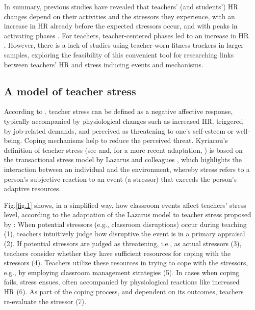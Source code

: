 \documentclass[preprint,
3p]{elsarticle} %
\begin{document}
In summary, previous studies have revealed that teachers' (and
students') HR changes depend on their activities and the stressors they
experience, with an increase in HR already before the expected stressors
occur, and with peaks in activating phases
\citep{Darnell2019, chalmers2021}. For teachers, teacher-centered phases
led to an increase in HR
\citep{sperka1995, scheuch1997psychophysische, donker2018, junker2021}.
However, there is a lack of studies using teacher-worn fitness trackers
in larger samples, exploring the feasibility of this convenient tool for
researching links between teachers' HR and stress inducing events and
mechanisms.

\subsection{A model of teacher stress}\label{a-model-of-teacher-stress}

According to \citet{kyriacou1978}, teacher stress can be defined as a
negative affective response, typically accompanied by physiological
changes such as increased HR, triggered by job-related demands, and
perceived as threatening to one's self-esteem or well-being. Coping
mechanisms help to reduce the perceived threat. Kyriacou's definition of
teacher stress (see \citet{kyriacou1978} and, for a more recent
adaptation, \citet{van2006stress}) is based on the transactional stress
model by Lazarus and colleagues
\citep{lazarus1966psychological, lazarus1990theory}, which highlights
the interaction between an individual and the environment, whereby
stress refers to a person's subjective reaction to an event (a stressor)
that exceeds the person's adaptive resources.

Fig.\ref{fig.1} shows, in a simplified way, how classroom events affect
teachers' stress level, according to the adaptation of the Lazarus model
to teacher stress proposed by \citet{van2006stress}: When potential
stressors (e.g., classroom disruptions) occur during teaching (1),
teachers intuitively judge how disruptive the event is in a primary
appraisal (2). If potential stressors are judged as threatening, i.e.,
as actual stressors (3), teachers consider whether they have sufficient
resources for coping with the stressors (4). Teachers utilize these
resources in trying to cope with the stressors, e.g., by employing
classroom management strategies (5). In cases when coping fails, stress
ensues, often accompanied by physiological reactions like increased HR
(6). As part of the coping process, and dependent on its outcomes,
teachers re-evaluate the stressor (7).
\end{document}
